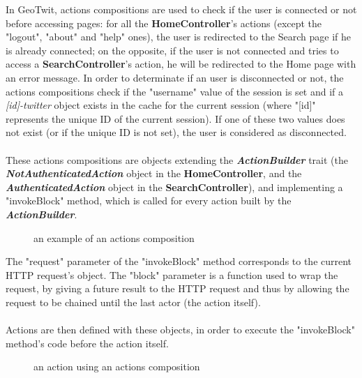 \documentclass[a4paper,11pt]{report}
\begin{document}
\newpage
In GeoTwit, actions compositions are used to check if the user is connected or not before accessing pages: for all the \textbf{HomeController}'s actions (except the "logout", "about" and "help" ones), the user is redirected to the Search page if he is already connected; on the opposite, if the user is not connected and tries to access a \textbf{SearchController}'s action, he will be redirected to the Home page with an error message. In order to determinate if an user is disconnected or not, the actions compositions check if the "username" value of the session is set and if a \emph{[id]-twitter} object exists in the cache for the current session (where "[id]" represents the unique ID of the current session). If one of these two values does not exist (or if the unique ID is not set), the user is considered as disconnected.\\\\
These actions compositions are objects extending the \textbf{\emph{ActionBuilder}} trait (the \textbf{\emph{NotAuthenticatedAction}} object in the \textbf{HomeController}, and the \textbf{\emph{AuthenticatedAction}} object in the \textbf{SearchController}), and implementing a "invokeBlock" method, which is called for every action built by the \textbf{\emph{ActionBuilder}}.
\begin{figure}[H]
\vspace{-5pt}
\begin{center}
\vspace{-20pt}
\caption{an example of an actions composition}
\end{center}
\end{figure}
\vspace{-10pt}

The "request" parameter of the "invokeBlock" method corresponds to the current HTTP request's object. The "block" parameter is a function used to wrap the request, by giving a future result to the HTTP request and thus by allowing the request to be chained until the last actor (the action itself).\\\\
Actions are then defined with these objects, in order to execute the "invokeBlock" method's code before the action itself.
\begin{figure}[H]
\vspace{-5pt}
\begin{center}
\vspace{-6pt}
\caption{an action using an actions composition}
\end{center}
\end{figure}
\vspace{-10pt}
\end{document}
